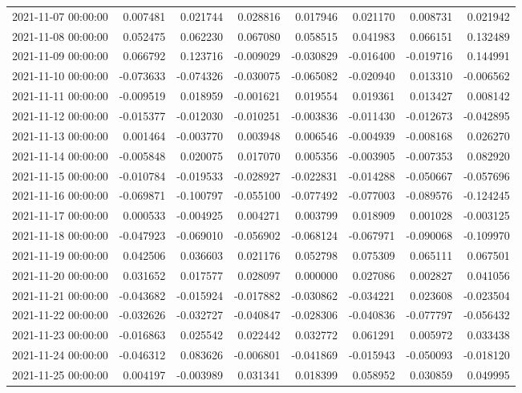 \begin{tabular}{lrrrrrrr}
2021-11-07 00:00:00 & 0.007481 & 0.021744 & 0.028816 & 0.017946 & 0.021170 & 0.008731 & 0.021942 \\
2021-11-08 00:00:00 & 0.052475 & 0.062230 & 0.067080 & 0.058515 & 0.041983 & 0.066151 & 0.132489 \\
2021-11-09 00:00:00 & 0.066792 & 0.123716 & -0.009029 & -0.030829 & -0.016400 & -0.019716 & 0.144991 \\
2021-11-10 00:00:00 & -0.073633 & -0.074326 & -0.030075 & -0.065082 & -0.020940 & 0.013310 & -0.006562 \\
2021-11-11 00:00:00 & -0.009519 & 0.018959 & -0.001621 & 0.019554 & 0.019361 & 0.013427 & 0.008142 \\
2021-11-12 00:00:00 & -0.015377 & -0.012030 & -0.010251 & -0.003836 & -0.011430 & -0.012673 & -0.042895 \\
2021-11-13 00:00:00 & 0.001464 & -0.003770 & 0.003948 & 0.006546 & -0.004939 & -0.008168 & 0.026270 \\
2021-11-14 00:00:00 & -0.005848 & 0.020075 & 0.017070 & 0.005356 & -0.003905 & -0.007353 & 0.082920 \\
2021-11-15 00:00:00 & -0.010784 & -0.019533 & -0.028927 & -0.022831 & -0.014288 & -0.050667 & -0.057696 \\
2021-11-16 00:00:00 & -0.069871 & -0.100797 & -0.055100 & -0.077492 & -0.077003 & -0.089576 & -0.124245 \\
2021-11-17 00:00:00 & 0.000533 & -0.004925 & 0.004271 & 0.003799 & 0.018909 & 0.001028 & -0.003125 \\
2021-11-18 00:00:00 & -0.047923 & -0.069010 & -0.056902 & -0.068124 & -0.067971 & -0.090068 & -0.109970 \\
2021-11-19 00:00:00 & 0.042506 & 0.036603 & 0.021176 & 0.052798 & 0.075309 & 0.065111 & 0.067501 \\
2021-11-20 00:00:00 & 0.031652 & 0.017577 & 0.028097 & 0.000000 & 0.027086 & 0.002827 & 0.041056 \\
2021-11-21 00:00:00 & -0.043682 & -0.015924 & -0.017882 & -0.030862 & -0.034221 & 0.023608 & -0.023504 \\
2021-11-22 00:00:00 & -0.032626 & -0.032727 & -0.040847 & -0.028306 & -0.040836 & -0.077797 & -0.056432 \\
2021-11-23 00:00:00 & -0.016863 & 0.025542 & 0.022442 & 0.032772 & 0.061291 & 0.005972 & 0.033438 \\
2021-11-24 00:00:00 & -0.046312 & 0.083626 & -0.006801 & -0.041869 & -0.015943 & -0.050093 & -0.018120 \\
2021-11-25 00:00:00 & 0.004197 & -0.003989 & 0.031341 & 0.018399 & 0.058952 & 0.030859 & 0.049995 \\

\end{tabular}

